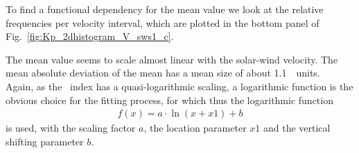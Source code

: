 To find a functional dependency for the mean \Kp{} value we look at the relative frequencies per velocity interval, which are plotted in the bottom panel of Fig.~\ref{fig:Kp_2dhistogram_V_sws1_c}.
\begin{figure}
\end{figure}
The mean \Kp{} value seems to scale almost linear with the solar-wind velocity. The mean absolute deviation of the mean has a mean size of about \SI{1.1}{\Kp~units}.\\

Again, as the \Kp~index has a quasi-logarithmic scaling, a logarithmic function is the obvious choice for the fitting process, for which thus the logarithmic function
\begin{align}
	f(x) = a \cdot \ln(x + x1) + b	\label{eq:log_offset_fit_function}
\end{align}
is used, with the scaling factor $a$, the location parameter $x1$ and the vertical shifting parameter $b$.\\

